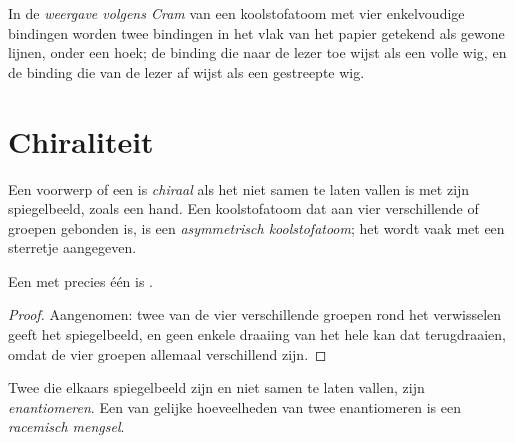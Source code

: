 \begin{definition}\label{def:g12:stereochemistry:cram}
In de \emph{weergave volgens Cram} van een
koolstofatoom met vier enkelvoudige bindingen worden twee bindingen in
het vlak van het papier getekend als gewone lijnen, onder een hoek; de
binding die naar de lezer toe wijst als een volle wig, en de binding die
van de lezer af wijst als een gestreepte wig.
\end{definition}

\section{Chiraliteit}

\begin{definition}\label{def:g12:stereochemistry:chiral}
Een voorwerp of een  is \emph{chiraal} als het
niet samen te laten vallen is met zijn spiegelbeeld, zoals een hand. Een
koolstofatoom dat aan vier verschillende  of groepen gebonden is,
is een \emph{asymmetrisch koolstofatoom};
het wordt vaak met een sterretje aangegeven.
\end{definition}

\begin{proposition}\label{prop:g12:stereochemistry:one-carbon}
Een  met precies één  is .
\end{proposition}

\begin{proof}
Aangenomen: twee van de vier verschillende groepen rond het  verwisselen geeft het spiegelbeeld, en geen enkele draaiing
van het hele  kan dat terugdraaien, omdat de vier groepen allemaal
verschillend zijn.
\end{proof}

\begin{definition}\label{def:g12:stereochemistry:enantiomer}
Twee  die elkaars spiegelbeeld zijn en niet samen te laten
vallen, zijn \emph{enantiomeren}. Een  van
gelijke hoeveelheden van twee enantiomeren is een \emph{racemisch
mengsel}.
\end{definition}

